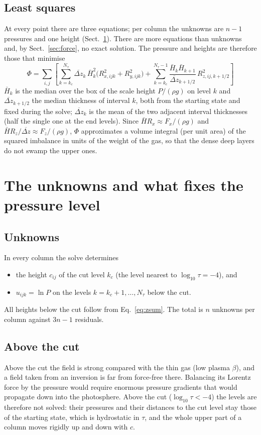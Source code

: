 \subsection{Least squares}
At every point there are three equations; per column the unknowns are $n-1$ pressures and one height (Sect.~\ref{sec:unk}).
There are more equations than unknowns and, by Sect.~\ref{sec:force}, no exact solution. The pressure and heights are
therefore those that minimise
\begin{equation}
\boxed{\;\Phi=\sum_{i,j}\left[\sum_{k=k_c}^{N_\tau}\overline{\Delta z}_k\,\bar H_k^2\big(R_{x,ijk}^2+R_{y,ijk}^2\big)
+\sum_{k=k_c}^{N_\tau-1}\frac{\bar H_k\bar H_{k+1}}{\overline{\Delta z}_{k+1/2}}\,R_{z,ij,k+1/2}^2\right]\;}\label{eq:Phi}
\end{equation}
$\bar H_k$ is the median over the box of the scale height $P/(\rho g)$ on level $k$ and $\overline{\Delta z}_{k+1/2}$ the
median thickness of interval $k$, both from the starting state and fixed during the solve; $\overline{\Delta z}_k$ is the mean
of the two adjacent interval thicknesses (half the single one at the end levels). Since $\bar H R_x\approx F_x/(\rho g)$ and
$\bar H R_z/\overline{\Delta z}\approx F_z/(\rho g)$, $\Phi$ approximates a volume integral (per unit area) of the squared
imbalance in units of the weight of the gas, so that the dense deep layers do not swamp the upper ones.

\section{The unknowns and what fixes the pressure level}\label{sec:unk}
\subsection{Unknowns}
In every column the solve determines
\begin{itemize}
\item the height $c_{ij}$ of the cut level $k_c$ (the level nearest to $\log_{10}\tau=-4$), and
\item $u_{ijk}=\ln P$ on the levels $k=k_c+1,\dots,N_\tau$ below the cut.
\end{itemize}
All heights below the cut follow from Eq.~\eqref{eq:zsum}. The total is $n$ unknowns per column against $3n-1$ residuals.

\subsection{Above the cut}
Above the cut the field is strong compared with the thin gas (low plasma $\beta$), and a field taken from an inversion is far
from force-free there. Balancing its Lorentz force by the pressure would require enormous pressure gradients that would
propagate down into the photosphere. Above the cut ($\log_{10}\tau<-4$) the levels are therefore not solved: their pressures and
their distances to the cut level stay those of the starting state, which is hydrostatic in $\tau$, and the whole upper part of a
column moves rigidly up and down with $c$.

